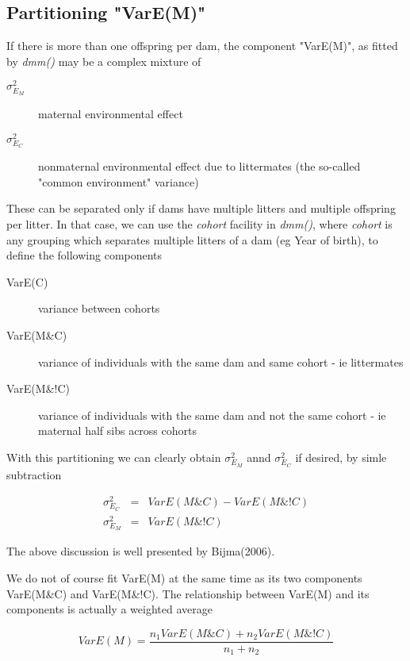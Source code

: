 \documentclass[titlepage]{article}  %
\begin{document}
\subsection{Partitioning "VarE(M)"}

If there is more than one offspring per dam, the component "VarE(M)", as fitted by {\em dmm()} may be a complex mixture of 

\begin{description}
\item [$\sigma^{2}_{E_{M}}$] maternal environmental effect
\item [$\sigma^{2}_{E_{C}}$] nonmaternal environmental effect due to littermates (the so-called "common environment" variance)
\end{description}

These can be separated only if dams have multiple litters and multiple offspring per litter. In that case, we can use the {\em cohort} facility in {\em dmm()}, where {\em cohort} is any grouping which separates multiple litters of a dam (eg Year of birth), to define the following components

\begin{description}
\item [VarE(C)]  variance between cohorts
\item [VarE(M\&C)] variance of individuals with the same dam and same cohort - ie littermates
\item [VarE(M\&!C)] variance of individuals with the same dam and not the same cohort - ie maternal half sibs across cohorts
\end{description}

With this partitioning we can clearly obtain $\sigma^{2}_{E_{M}}$ annd $\sigma^{2}_{E_{C}}$ if desired, by simle subtraction

\begin{eqnarray*}
\sigma^{2}_{E_{C}} & = & VarE(M\&C) - VarE(M\&!C) \\
\sigma^{2}_{E_{M}} & = & VarE(M\&!C)
\end{eqnarray*}

The above discussion is well presented by Bijma(2006)\cite{bijm:06}.

We do not of course fit VarE(M) at the same time as its two components VarE(M\&C) and VarE(M\&!C). The relationship between VarE(M) and its components is actually a weighted average

\begin{displaymath}
VarE(M) = \frac{n_{1} VarE(M\&C) + n_{2} VarE(M\&!C)}{n_{1} + n_{2}}
\end{displaymath}
\end{document}
